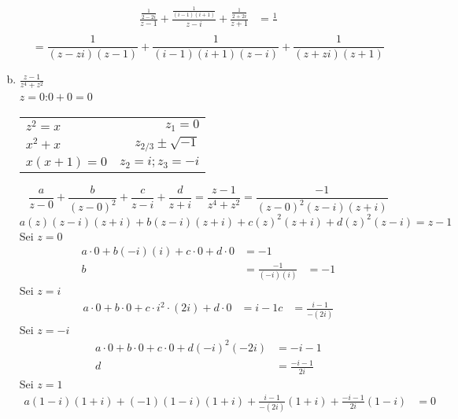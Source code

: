 \documentclass[11pt,a4paper]{article}
\begin{document}
\begin{enumerate}[a)]
\begin{align*}
        \frac{\frac{1}{2-2i}}{z-1}+\frac{\frac{1}{\left(i-1\right)\left(i+1\right)}}{z-i}+\frac{\frac{1}{2+2i}}{z+1}&=\frac{1}{}\\
    \end{align*}
    \begin{equation*}
        =\frac{1}{\left(z-zi\right)\left(z-1\right)}+\frac{1}{\left(i-1\right)\left(i+1\right)\left(z-i\right)}+\frac{1}{\left(z+zi\right)\left(z+1\right)}
    \end{equation*}
      \item $\frac{z-1}{z^4+z^2}$\\
      $z=0$:$0+0=0$\\
      \begin{tabular}{lr}
        $z^2=x$&$z_1=0$\\
        $x^2+x$&$z_{2/3}\pm\sqrt{-1}$\\
        $x\left(x+1\right)=0$ & $z_2=i;z_3=-i$
      \end{tabular}
      \begin{equation*}
        \frac{a}{z-0}+\frac{b}{\left(z-0\right)^2}+\frac{c}{z-i}+\frac{d}{z+i} = \frac{z-1}{z^4+z^2} = \frac{-1}{\left(z-0\right)^2\left(z-i\right)\left(z+i\right)}
      \end{equation*}
      \begin{equation*}
        a\left(z\right)\left(z-i\right)\left(z+i\right)+b\left(z-i\right)\left(z+i\right)+c\left(z\right)^2\left(z+i\right)+d\left(z\right)^2\left(z-i\right)=z-1
      \end{equation*}
      Sei $z=0$
      \begin{align*}
        a\cdot 0+b\left(-i\right)\left(i\right)+c\cdot 0+ d\cdot 0 &= -1\\
        b&=\frac{-1}{\left(-i\right)\left(i\right)}&=-1
      \end{align*}
      Sei $z=i$
      \begin{align*}
        a\cdot 0+b\cdot 0+c\cdot i^2 \cdot \left(2i\right)+d\cdot 0&=i-1
        c&=\frac{i-1}{-\left(2i\right)}
      \end{align*}
      Sei $z=-i$
      \begin{align*}
        a\cdot 0+b\cdot 0+c\cdot 0+d\left(-i\right)^2\left(-2i\right)&=-i-1\\
        d&=\frac{-i-1}{2i}
      \end{align*}
      Sei $z=1$
      \begin{align*}
        a(1-i)(1+i)+(-1)(1-i)(1+i)+\frac{i-1}{-(2i)}(1+i)+\frac{-i-1}{2i}(1-i)&=0\\

\end{align*}
\end{enumerate}
\end{document}
